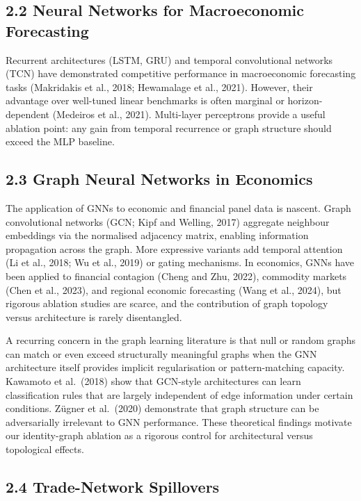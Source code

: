 \documentclass[
]{article}
\begin{document}
\subsection{2.2 Neural Networks for Macroeconomic
Forecasting}\label{neural-networks-for-macroeconomic-forecasting}

Recurrent architectures (LSTM, GRU) and temporal convolutional networks
(TCN) have demonstrated competitive performance in macroeconomic
forecasting tasks (Makridakis et al., 2018; Hewamalage et al., 2021).
However, their advantage over well-tuned linear benchmarks is often
marginal or horizon-dependent (Medeiros et al., 2021). Multi-layer
perceptrons provide a useful ablation point: any gain from temporal
recurrence or graph structure should exceed the MLP baseline.

\subsection{2.3 Graph Neural Networks in
Economics}\label{graph-neural-networks-in-economics}

The application of GNNs to economic and financial panel data is nascent.
Graph convolutional networks (GCN; Kipf and Welling, 2017) aggregate
neighbour embeddings via the normalised adjacency matrix, enabling
information propagation across the graph. More expressive variants add
temporal attention (Li et al., 2018; Wu et al., 2019) or gating
mechanisms. In economics, GNNs have been applied to financial contagion
(Cheng and Zhu, 2022), commodity markets (Chen et al., 2023), and
regional economic forecasting (Wang et al., 2024), but rigorous ablation
studies are scarce, and the contribution of graph topology versus
architecture is rarely disentangled.

A recurring concern in the graph learning literature is that null or
random graphs can match or even exceed structurally meaningful graphs
when the GNN architecture itself provides implicit regularisation or
pattern-matching capacity. Kawamoto et al.~(2018) show that GCN-style
architectures can learn classification rules that are largely
independent of edge information under certain conditions. Z\"ugner et
al.~(2020) demonstrate that graph structure can be adversarially
irrelevant to GNN performance. These theoretical findings motivate our
identity-graph ablation as a rigorous control for architectural versus
topological effects.

\subsection{2.4 Trade-Network
Spillovers}\label{trade-network-spillovers}
\end{document}
